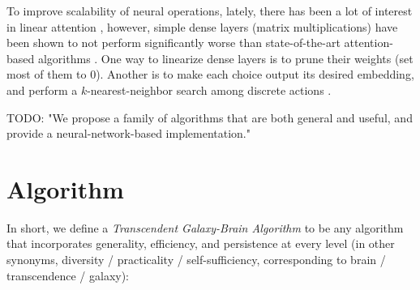\documentclass{article}
\begin{document}
To improve scalability of neural operations, lately, there has been a lot of interest in linear attention \cite{schlag2021linear}, however, simple dense layers (matrix multiplications) have been shown to not perform significantly worse than state-of-the-art attention-based algorithms \cite{tolstikhin2021mlpmixer}. One way to linearize dense layers is to prune their weights \cite{zhou2021effective} (set most of them to $0$). Another is to make each choice output its desired embedding, and perform a $k$-nearest-neighbor search among discrete actions \cite{DBLP:journals/corr/Dulac-ArnoldESC15}.

    TODO: "We propose a family of algorithms that are both general and useful, and provide a neural-network-based implementation."

\section{Algorithm}

In short, we define a \textit{Transcendent Galaxy-Brain Algorithm} to be any algorithm that incorporates generality, efficiency, and persistence at every level (in other synonyms, diversity / practicality / self-sufficiency, corresponding to brain / transcendence / galaxy):
\end{document}
